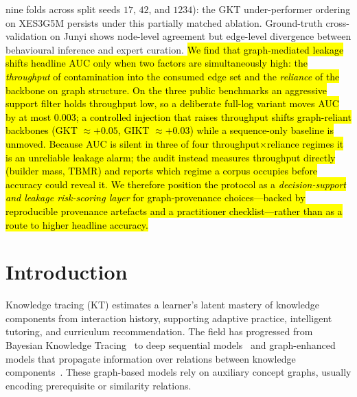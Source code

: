 \documentclass[pdflatex,sn-mathphys-num]{sn-jnl}
\newcommand{\KCs}{knowledge components}
\newcommand{\rev}[1]{\hl{#1}}
\newcommand{\rev}[1]{#1}
\begin{document}
{nine folds across split seeds $17$, $42$, and $1234$): the GKT
under-performer ordering on XES3G5M persists under this partially matched
ablation.
Ground-truth cross-validation on Junyi shows node-level agreement but
edge-level divergence between behavioural inference and expert curation.
\rev{We find that graph-mediated leakage shifts headline AUC only when two
factors are simultaneously high: the \emph{throughput} of contamination into
the consumed edge set and the \emph{reliance} of the backbone on graph
structure. On the three public benchmarks an aggressive support filter holds
throughput low, so a deliberate full-log variant moves AUC by at most \mbox{$0.003$};
a controlled injection that raises throughput shifts graph-reliant backbones
(GKT \mbox{${\approx}{+}0.05$}, GIKT \mbox{${\approx}{+}0.03$}) while a sequence-only
baseline is unmoved. Because AUC is silent in three of four
throughput\mbox{$\times$}reliance regimes it is an unreliable leakage alarm; the
audit instead measures throughput directly (builder mass, \mbox{$\mathrm{TBMR}$}) and
reports which regime a corpus occupies before accuracy could reveal it. We
therefore position the protocol as a \emph{decision-support and leakage
risk-scoring layer} for graph-provenance choices---backed by reproducible
provenance artefacts and a practitioner checklist---rather than as a route to
higher headline accuracy.}}


\maketitle

\section{Introduction}
\label{sec:intro}
Knowledge tracing (KT) estimates a learner's latent mastery of
\KCs{} from interaction history, supporting adaptive practice,
intelligent tutoring, and curriculum recommendation. The field has
progressed from Bayesian Knowledge Tracing~\cite{corbett1995bkt} to
deep sequential models~\cite{piech2015dkt,zhang2017dkvmn,ghosh2020akt,liu2023simplekt,pandey2019rkt,shen2021saint} and graph-enhanced models
that propagate information over relations between
\KCs{}~\cite{nakagawa2019gkt,tong2020skt,yang2021gikt,dygkt2024,dgekt2024,chen2023hgkt}. These graph-based models rely on
auxiliary concept graphs, usually encoding prerequisite or similarity
relations.
\end{document}
